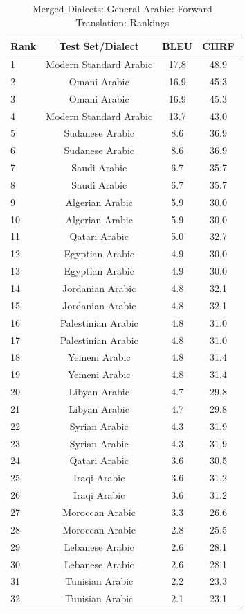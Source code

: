 \begin{table}[htbp]
\centering
\caption{Merged Dialects: General Arabic: Forward Translation: Rankings}
\label{tab:testset_ranking_forward_merged_arabic_general}
\begin{tabular}{l@{\hspace{3pt}}c@{\hspace{3pt}}c@{\hspace{3pt}}c}
\toprule
Rank & Test Set/Dialect & BLEU & CHRF \\
\midrule
1 & Modern Standard Arabic  & 17.8 & 48.9 \\
2 & Omani Arabic & 16.9 & 45.3 \\
3 & Omani Arabic  & 16.9 & 45.3 \\
4 & Modern Standard Arabic & 13.7 & 43.0 \\
5 & Sudanese Arabic & 8.6 & 36.9 \\
6 & Sudanese Arabic  & 8.6 & 36.9 \\
7 & Saudi Arabic & 6.7 & 35.7 \\
8 & Saudi Arabic  & 6.7 & 35.7 \\
9 & Algerian Arabic & 5.9 & 30.0 \\
10 & Algerian Arabic  & 5.9 & 30.0 \\
11 & Qatari Arabic  & 5.0 & 32.7 \\
12 & Egyptian Arabic & 4.9 & 30.0 \\
13 & Egyptian Arabic  & 4.9 & 30.0 \\
14 & Jordanian Arabic & 4.8 & 32.1 \\
15 & Jordanian Arabic  & 4.8 & 32.1 \\
16 & Palestinian Arabic & 4.8 & 31.0 \\
17 & Palestinian Arabic  & 4.8 & 31.0 \\
18 & Yemeni Arabic & 4.8 & 31.4 \\
19 & Yemeni Arabic  & 4.8 & 31.4 \\
20 & Libyan Arabic & 4.7 & 29.8 \\
21 & Libyan Arabic  & 4.7 & 29.8 \\
22 & Syrian Arabic & 4.3 & 31.9 \\
23 & Syrian Arabic  & 4.3 & 31.9 \\
24 & Qatari Arabic & 3.6 & 30.5 \\
25 & Iraqi Arabic & 3.6 & 31.2 \\
26 & Iraqi Arabic  & 3.6 & 31.2 \\
27 & Moroccan Arabic  & 3.3 & 26.6 \\
28 & Moroccan Arabic & 2.8 & 25.5 \\
29 & Lebanese Arabic & 2.6 & 28.1 \\
30 & Lebanese Arabic  & 2.6 & 28.1 \\
31 & Tunisian Arabic  & 2.2 & 23.3 \\
32 & Tunisian Arabic & 2.1 & 23.1 \\
\bottomrule
\end{tabular}
\end{table}
